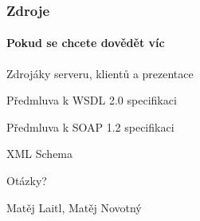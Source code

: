 \documentclass[12pt]{beamer}
\begin{document}
\begin{frame}
  \frametitle{Zdroje}
  \framesubtitle{Pokud se chcete dovědět víc}
  \begin{thebibliography}{10}

  \beamertemplatearticlebibitems

    Zdrojáky serveru, klientů a prezentace

    Předmluva k WSDL 2.0 specifikaci

    Předmluva k SOAP 1.2 specifikaci

    XML Schema

  \end{thebibliography}
\end{frame}

\begin{frame}
  \vspace{2cm}
  {\huge Otázky?}

  \vspace{3cm}
  \begin{flushright}
    Matěj Laitl, Matěj Novotný

  \end{flushright}
\end{frame}
\end{document}
